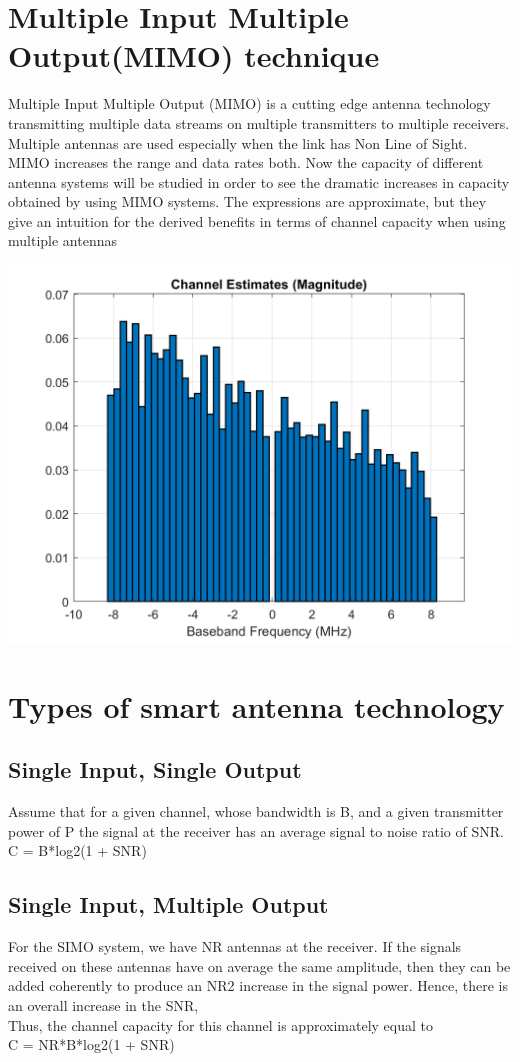 \documentclass[12pt]{report}
\begin{document}
\section*{Multiple Input Multiple Output(MIMO) technique}
Multiple Input Multiple Output (MIMO) is a cutting edge antenna
technology transmitting multiple data streams on multiple transmitters
to multiple receivers. Multiple antennas are used especially when
the link has Non Line of Sight. MIMO increases the range and data
rates both.
Now the capacity of different antenna systems will be studied in order
to see the dramatic increases in capacity obtained by using MIMO systems. The expressions are approximate, but they give an intuition for
the derived benefits in terms of channel capacity when using multiple
antennas

\includegraphics[width=\columnwidth]{channel_est.png}
\section*{Types of smart antenna technology}
\subsection*{Single Input, Single Output}
Assume that for a given channel, whose bandwidth is B, and a given
transmitter power of P the signal at the receiver has an average signal
to noise ratio of SNR.\\
C = B*log2(1 + SNR)

\subsection*{Single Input, Multiple Output}
For the SIMO system, we have NR antennas at the receiver. If the signals
received on these antennas have on average the same amplitude, then
they can be added coherently to produce an NR2 increase in the signal
power. Hence, there is an overall increase in the SNR,\\
Thus, the channel capacity for this channel is approximately equal to\\
C = NR*B*log2(1 + SNR)
\end{document}
